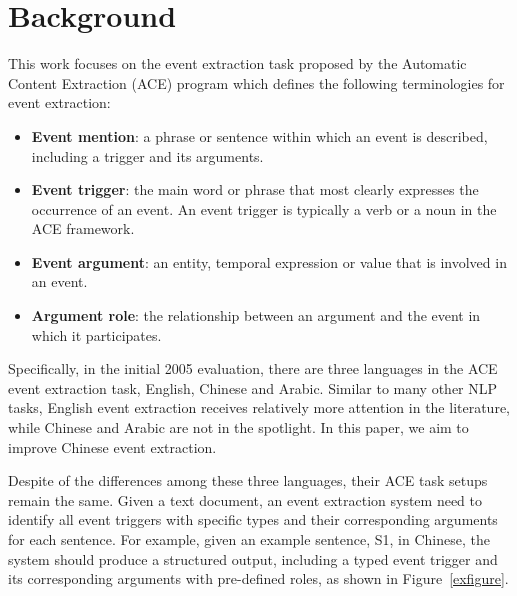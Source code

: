 \section{Background}
\label{background}
This work focuses on the
event extraction task proposed by the Automatic Content Extraction (ACE) program \cite{doddington2004automatic} which
defines the following terminologies for event extraction:

\begin{itemize}
	\item \textbf{Event mention}:  a phrase or sentence within which an event is described, including a trigger and its arguments.
	\item \textbf{Event trigger}: the main word or phrase that most clearly expresses the occurrence of an event. An event trigger is typically a verb or a noun in the ACE framework.
	\item \textbf{Event argument}: an entity, temporal expression or value that is involved in an event.
	\item \textbf{Argument role}: the relationship between an argument and the event in which it participates.
\end{itemize}

Specifically, in the initial 2005 evaluation, there are three languages in the ACE event extraction task,  English, Chinese and Arabic. Similar to many other NLP tasks, English event extraction receives relatively more attention in the literature, while Chinese and Arabic are not in the spotlight.  In this paper, we aim to improve Chinese event extraction.

Despite of the differences among these three languages, their ACE task setups remain the same.
Given a text document, an event extraction system need to identify all event triggers with specific types and their corresponding arguments for each sentence. For example, given an example sentence, S1, in Chinese, the system should produce a structured output, including a typed event trigger  and its corresponding arguments  with pre-defined  roles, as shown in Figure~\ref{exfigure}.

